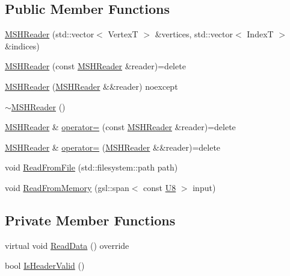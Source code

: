 \subsection*{Public Member Functions}
\begin{DoxyCompactItemize}
\item 
\mbox{\hyperlink{classmage_1_1rendering_1_1loader_1_1_m_s_h_reader_adf50a71f368cd580433b3dab5ea3a1ac}{M\+S\+H\+Reader}} (std\+::vector$<$ VertexT $>$ \&vertices, std\+::vector$<$ IndexT $>$ \&indices)
\item 
\mbox{\hyperlink{classmage_1_1rendering_1_1loader_1_1_m_s_h_reader_ae16a36afbfe65791cdfe8dadd6b57af2}{M\+S\+H\+Reader}} (const \mbox{\hyperlink{classmage_1_1rendering_1_1loader_1_1_m_s_h_reader}{M\+S\+H\+Reader}} \&reader)=delete
\item 
\mbox{\hyperlink{classmage_1_1rendering_1_1loader_1_1_m_s_h_reader_a107ac854c231c1a1c39f30c5199dcec7}{M\+S\+H\+Reader}} (\mbox{\hyperlink{classmage_1_1rendering_1_1loader_1_1_m_s_h_reader}{M\+S\+H\+Reader}} \&\&reader) noexcept
\item 
\mbox{\hyperlink{classmage_1_1rendering_1_1loader_1_1_m_s_h_reader_af45daf383d4e94586b5d2968d5357fce}{$\sim$\+M\+S\+H\+Reader}} ()
\item 
\mbox{\hyperlink{classmage_1_1rendering_1_1loader_1_1_m_s_h_reader}{M\+S\+H\+Reader}} \& \mbox{\hyperlink{classmage_1_1rendering_1_1loader_1_1_m_s_h_reader_a106e5a6cce46777cf7ae36cb4034e1a0}{operator=}} (const \mbox{\hyperlink{classmage_1_1rendering_1_1loader_1_1_m_s_h_reader}{M\+S\+H\+Reader}} \&reader)=delete
\item 
\mbox{\hyperlink{classmage_1_1rendering_1_1loader_1_1_m_s_h_reader}{M\+S\+H\+Reader}} \& \mbox{\hyperlink{classmage_1_1rendering_1_1loader_1_1_m_s_h_reader_a8764164f7e0f78938c5e303d13e0f64d}{operator=}} (\mbox{\hyperlink{classmage_1_1rendering_1_1loader_1_1_m_s_h_reader}{M\+S\+H\+Reader}} \&\&reader)=delete
\item 
void \mbox{\hyperlink{classmage_1_1rendering_1_1loader_1_1_m_s_h_reader_a0308b90e3cf888d383a228cfe8827972}{Read\+From\+File}} (std\+::filesystem\+::path path)
\item 
void \mbox{\hyperlink{classmage_1_1rendering_1_1loader_1_1_m_s_h_reader_afc48490dca5042078726a1ec3fe7abe7}{Read\+From\+Memory}} (gsl\+::span$<$ const \mbox{\hyperlink{namespacemage_a30677c03d683c4c35630c25f6ff3fb7f}{U8}} $>$ input)
\end{DoxyCompactItemize}
\subsection*{Private Member Functions}
\begin{DoxyCompactItemize}
\item 
virtual void \mbox{\hyperlink{classmage_1_1rendering_1_1loader_1_1_m_s_h_reader_a99e8e3c50decb9332dc10bcdf7b6e00a}{Read\+Data}} () override
\item 
bool \mbox{\hyperlink{classmage_1_1rendering_1_1loader_1_1_m_s_h_reader_a7e6948dfb5f5c672719ebe10c4dae6bf}{Is\+Header\+Valid}} ()
\end{DoxyCompactItemize}
